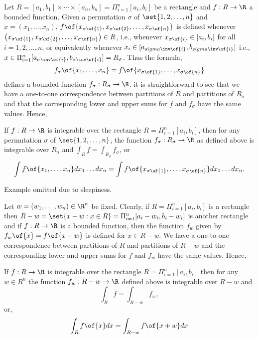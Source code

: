 Let $R = [a_1,b_1] \times \cdots \times [a_n, b_n] = \Pi_{i=1}^n [a_i,b_i]$ be a rectangle and $f: R \to \R$ a bounded function. Given a permutation $\sigma$ of $\set{1,2,\dots,n}$ and $x = (x_1,\dots,x_n)$, $f\of{x_{\sigma\of{1}}, x_{\sigma\of{2}}, \dots, x_{\sigma\of{n}}}$ is defined whenever $\left(x_{\sigma\of{1}}, x_{\sigma\of{2}}, \dots, x_{\sigma\of{n}}\right) \in R$, i.e., whenever $x_{\sigma\of{i}} \in [a_i,b_i]$ for all $i = 1, 2, \dots, n$, or equivalently whenever $x_i \in [a_{sigma\inv\of{i}}, b_{sigma\inv\of{i}}]$ i.e., $x \in \Pi_{i=1}^n [a_{\sigma\inv\of{i}}, b_{\sigma\inv\of{i}}] = R_\sigma$. Thus the formula,
\[f_\sigma\of{x_1, \dots, x_n} = f\of{x_{\sigma\of{1}}, \dots, x_{\sigma\of{n}}}\]
defines a bounded function $f_\sigma: R_\sigma \to \R$. it is straightforward to see that we have a one-to-one correspondence between partitions of $R$ and partitions of $R_\sigma$ and that the corresponding lower and upper sums for $f$ and $f_\sigma$ have the same values. Hence,

\begin{theorem}
    If $f: R \to \R$ is integrable over the rectangle $R = \Pi_{i=1}^n [a_i, b_i]$, then for any permutation $\sigma$ of $\set{1,2,\dots,n}$, the function $f_\sigma: R_\sigma \to \R$ as defined above is integrable over $R_\sigma$ and $\int_R f = \int_{R_\sigma} f_\sigma$, or
    \[\int f\of{x_1, \dots, x_n} dx_1 \dots dx_n = \int f\of{x_{\sigma\of{1}}, \dots, x_{\sigma\of{n}}} dx_1 \dots dx_n.\]
\end{theorem}

Example omitted due to sleepiness.

Let $w = \left(w_1, \dots, w_n\right) \in \R^n$ be fixed. Clearly, if $R = \Pi_{i=1}^n [a_i,b_i]$ is a rectangle then $R - w = \set{x - w: x \in R} = \Pi_{i=1}^n [a_i - w_i, b_i - w_i]$ is another rectangle and if $f: R \to \R$ is a bounded function, then the function $f_w$ given by $f_w\of{x} = f\of{x + w}$ is defined for $x \in R - w$. We have a one-to-one correspondence between partitions of $R$ and partitions of $R-w$ and the corresponding lower and upper sums for $f$ and $f_w$ have the same values. Hence,

\begin{theorem}
    If $f: R \to \R$ is integrable over the rectangle $R = \Pi_{i=1}^n [a_i,b_i]$ then for any $w \in R^n$ the function $f_w: R-w \to \R$ defined above is integrable over $R - w$ and \[\int_R f = \int_{R-w} f_w,\] or, \[\int_R f\of{x} dx = \int_{R-w} f\of{x+w} dx\]
\end{theorem}

